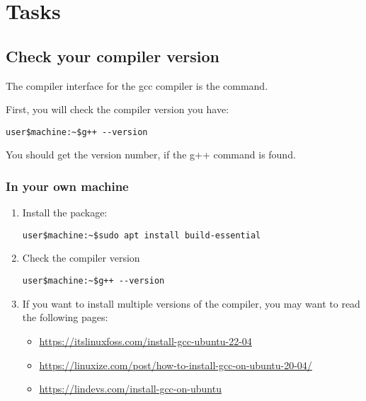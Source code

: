 \section{Tasks}

\subsection{Check your compiler version}

The compiler interface for the gcc compiler is the  command.

First, you will check the compiler version you have:

\begin{lstlisting}[style=terminal]
user$machine:~$g++ --version
\end{lstlisting}

You should get the version number, if the g++ command is found.

\subsubsection{In your own machine}

\begin{enumerate}

\item Install the  package:

\begin{lstlisting}[style=terminal]
user$machine:~$sudo apt install build-essential
\end{lstlisting}

\item Check the compiler version

\begin{lstlisting}[style=terminal]
user$machine:~$g++ --version
\end{lstlisting}

\item If you want to install multiple versions of the compiler,
      you may want to read the following pages:
  \begin{itemize}
    \item \url{https://itslinuxfoss.com/install-gcc-ubuntu-22-04}
    \item \url{https://linuxize.com/post/how-to-install-gcc-on-ubuntu-20-04/}
    \item \url{https://lindevs.com/install-gcc-on-ubuntu}
  \end{itemize}
\end{enumerate}

